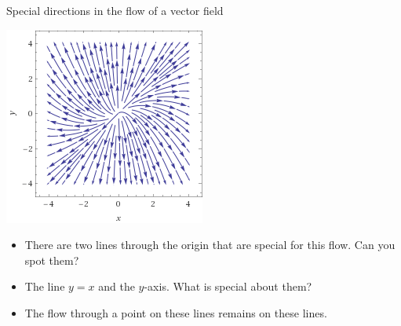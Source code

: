 \documentclass{beamer}
\begin{document}

\begin{frame}{Special directions in the flow of a vector field}


\begin{center}
\includegraphics[scale=0.45]{stream1}
\end{center}

\begin{itemize}
\item There are two lines through the origin that are special for this flow. Can you spot them?
\item The line $y=x$ and the $y$-axis. What is special about them?
\item The flow through a point on these lines remains on these lines.
\end{itemize}
\end{frame}

\end{document}
